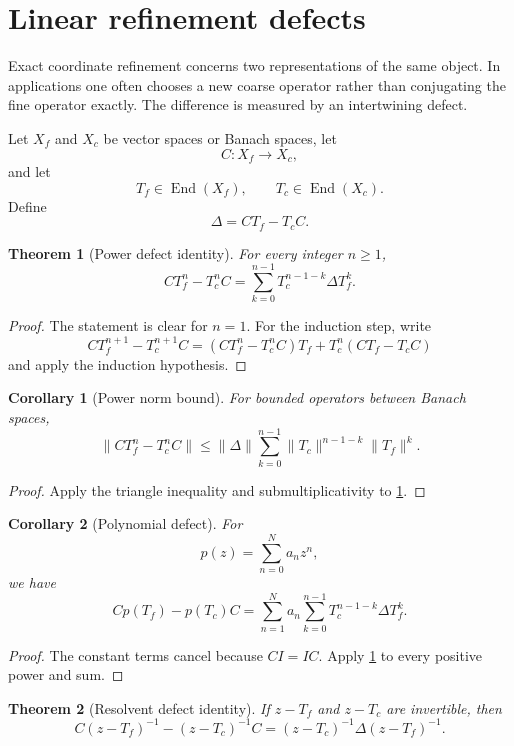 \documentclass{aomart}
\newtheorem{theorem}{Theorem}[section]
\newtheorem{corollary}[corollary]{Corollary}
\theoremstyle{definition}
\theoremstyle{remark}
\newcommand{\End}{\operatorname{End}}
\begin{document}
\section{Linear refinement defects}\label{sec:defects}

Exact coordinate refinement concerns two representations of the same object.  In applications one often chooses a new coarse operator rather than conjugating the fine operator exactly.  The difference is measured by an intertwining defect.

Let $X_f$ and $X_c$ be vector spaces or Banach spaces, let
\[
C:X_f\longrightarrow X_c,
\]
and let
\[
T_f\in\End(X_f),
\qquad
T_c\in\End(X_c).
\]
Define
\[
\Delta=CT_f-T_cC.
\]

\begin{theorem}[Power defect identity]\label{thm:power_defect}
For every integer $n\geq1$,
\[
CT_f^n-T_c^nC
=
\sum_{k=0}^{n-1}T_c^{n-1-k}\Delta T_f^k.
\]
\end{theorem}

\begin{proof}
The statement is clear for $n=1$.  For the induction step, write
\[
CT_f^{n+1}-T_c^{n+1}C
=
(CT_f^n-T_c^nC)T_f+T_c^n(CT_f-T_cC)
\]
and apply the induction hypothesis.
\end{proof}

\begin{corollary}[Power norm bound]\label{cor:power_norm}
For bounded operators between Banach spaces,
\[
\|CT_f^n-T_c^nC\|
\leq
\|\Delta\|
\sum_{k=0}^{n-1}
\|T_c\|^{n-1-k}\|T_f\|^k.
\]
\end{corollary}

\begin{proof}
Apply the triangle inequality and submultiplicativity to \cref{thm:power_defect}.
\end{proof}

\begin{corollary}[Polynomial defect]\label{cor:polynomial_defect}
For
\[
p(z)=\sum_{n=0}^Na_nz^n,
\]
we have
\[
Cp(T_f)-p(T_c)C
=
\sum_{n=1}^Na_n
\sum_{k=0}^{n-1}T_c^{n-1-k}\Delta T_f^k.
\]
\end{corollary}

\begin{proof}
The constant terms cancel because $CI=IC$.  Apply \cref{thm:power_defect} to every positive power and sum.
\end{proof}

\begin{theorem}[Resolvent defect identity]\label{thm:resolvent_defect}
If $z-T_f$ and $z-T_c$ are invertible, then
\[
C(z-T_f)^{-1}-(z-T_c)^{-1}C
=
(z-T_c)^{-1}\Delta(z-T_f)^{-1}.
\]
\end{theorem}
\end{document}
